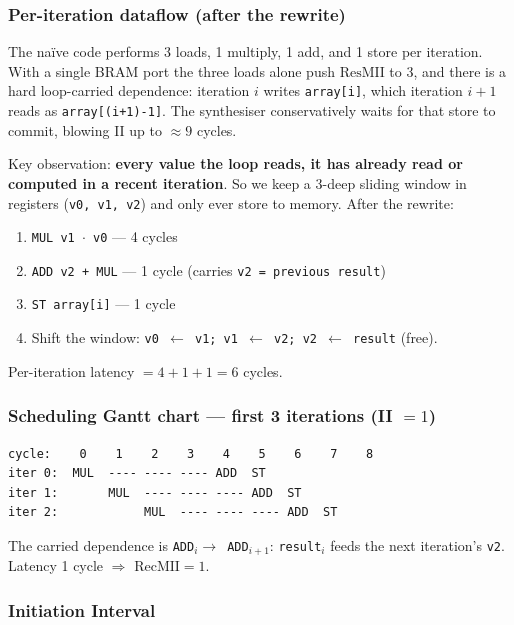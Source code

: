 \documentclass[11pt,a4paper]{article}
\begin{document}
\subsubsection*{Per-iteration dataflow (after the rewrite)}

The na\"ive code performs 3 loads, 1 multiply, 1 add, and 1 store per iteration. With a single BRAM port the three loads alone push $\mathrm{ResMII}$ to 3, and there is a hard loop-carried dependence: iteration $i$ writes \texttt{array[i]}, which iteration $i+1$ reads as \texttt{array[(i+1)-1]}. The synthesiser conservatively waits for that store to commit, blowing II up to $\approx 9$ cycles.

Key observation: \textbf{every value the loop reads, it has already read or computed in a recent iteration}. So we keep a 3-deep sliding window in registers (\texttt{v0, v1, v2}) and only ever store to memory. After the rewrite:

\begin{enumerate}[noitemsep]
  \item \texttt{MUL v1 $\cdot$ v0} --- 4 cycles
  \item \texttt{ADD v2 + MUL} --- 1 cycle (carries \texttt{v2 = previous result})
  \item \texttt{ST array[i]} --- 1 cycle
  \item Shift the window: \texttt{v0 $\leftarrow$ v1; v1 $\leftarrow$ v2; v2 $\leftarrow$ result} (free).
\end{enumerate}

Per-iteration latency $= 4 + 1 + 1 = 6$ cycles.

\subsubsection*{Scheduling Gantt chart --- first 3 iterations (II $=1$)}

\begin{lstlisting}[style=schedule]
cycle:    0    1    2    3    4    5    6    7    8
iter 0:  MUL  ---- ---- ---- ADD  ST
iter 1:       MUL  ---- ---- ---- ADD  ST
iter 2:            MUL  ---- ---- ---- ADD  ST
\end{lstlisting}

The carried dependence is \texttt{ADD$_i \to$ ADD$_{i+1}$}: \texttt{result$_i$} feeds the next iteration's \texttt{v2}. Latency 1 cycle $\Rightarrow$ $\mathrm{RecMII} = 1$.

\subsubsection*{Initiation Interval}
\end{document}
